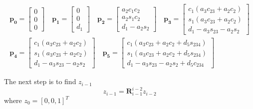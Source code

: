\begin{align*}
    \bm{p_0} = \begin{bmatrix} 0 \\ 0 \\ 0 \end{bmatrix}    \quad
    \bm{p_1} = \begin{bmatrix} 0 \\ 0 \\ d_1\end{bmatrix}    \quad
    \bm{p_2} = \begin{bmatrix} a_2c_1c_2\\ a_2s_1c_2\\ d_1 - a_2s_2\end{bmatrix}   \quad 
    \bm{p_3} = \begin{bmatrix} c_1(a_3c_{23} + a_2c_2) \\ s_1(a_3c_{23} + a_2c_2) \\ d_1 - a_3s_{23}-a_2s_2 \end{bmatrix}  \\  
    \bm{p_4} = \begin{bmatrix} c_1(a_3c_{23} + a_2c_2) \\ s_1(a_3c_{23} + a_2c_2) \\ d_1 - a_3s_{23}-a_2s_2\end{bmatrix}  \quad  
    \bm{p_5} = \begin{bmatrix} c_1(a_3c_{23} + a_2c_2 + d_5s_{234}) \\ s_1(a_3c_{23} + a_2c_2 + d_5s_{234}) \\ d_1 - a_3s_{23} - a_2s_2 + d_5c_{234} \end{bmatrix}    
\end{align*}

The next step is to find $z_{i-1}$
$$
z_{i-1} = \bm{R}_{i-1}^{i-2}z_{i-2}
$$
where $z_0 = [0,0,1]^T$


















































